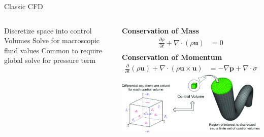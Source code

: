 \placelogofalse
\begin{frame}{Classic CFD}
\begin{columns}
\begin{outline}
\1 Discretize space into control Volumes 
\1 Solve for macroscopic fluid values
\1 Common to require global solve for pressure term
\end{outline}

\centering
\begin{center}
\textbf{Conservation of Mass}
\begin{align*}
  \frac{\partial \rho}{\partial t} + \nabla \cdot (\rho \bm{u}) &= 0 \\
\end{align*}
\textbf{Conservation of Momentum}
\begin{align*}
\frac{\partial}{\partial t} (\rho \bm{u}) 
+ \nabla \cdot (\rho \bm{u} \times \bm{u}) &= 
- \nabla \bm{p} + \nabla \cdot \sigma
\end{align*}
  \includegraphics[width=0.8\linewidth]{FVM.png}
\end{center}
\placelogotrue

\end{columns}
\end{frame}

